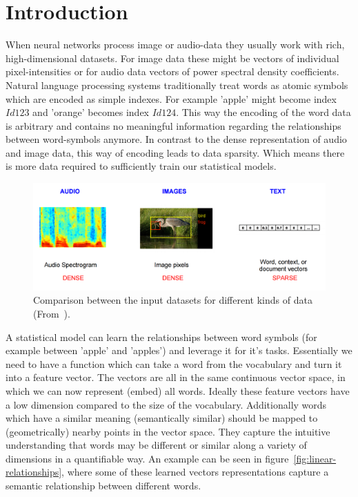\section{Introduction}
\label{sec:Introduction}


When neural networks process image or audio-data they usually work with rich, high-dimensional datasets.
For image data these might be vectors of individual pixel-intensities or for audio data vectors of power spectral density coefficients.
Natural language processing systems traditionally treat words as atomic symbols which are
encoded as simple indexes. For example 'apple' might become index $Id123$ and 'orange' becomes index $Id124$. This way the
encoding of the word data is arbitrary and contains no meaningful information regarding the relationships between word-symbols anymore.
In contrast to the dense representation of audio and image data, this way of encoding leads to data sparsity. Which means there is more data
required to sufficiently train our statistical models.

\begin{figure}[H]
\begin{center}
  \includegraphics[width=\textwidth]{./img/audio-image-text}
  \caption{Comparison between the input datasets for different kinds of data (From~\cite{tensorflow:word2vec}).}
  \label{fig:audio-image-text}
\end{center}
\end{figure}

A statistical model can learn the relationships between word symbols (for example between 'apple' and 'apples') and leverage it for it's tasks.
Essentially we need to have a function which can take a word from the vocabulary and turn it into a feature vector.
The vectors are all in the same continuous vector space, in which we can now represent (embed) all words.
Ideally these feature vectors have a low dimension compared to the size of the vocabulary. Additionally words which have a
similar meaning (semantically similar) should be mapped to (geometrically) nearby points in the vector space.
They capture the intuitive understanding that words may be different 
or similar along a variety of dimensions in a quantifiable way.
An example can be seen in figure~\ref{fig:linear-relationships}, where some of these learned vectors representations
capture a semantic relationship between different words.

